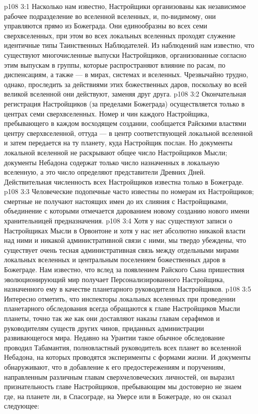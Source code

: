 \vs p108 3:1 Насколько нам известно, Настройщики организованы как независимое рабочее подразделение во вселенной вселенных, и, по\hyp{}видимому, они управляются прямо из Божеграда. Они единообразны во всех семи сверхвселенных, при этом во всех локальных вселенных проходят служение идентичные типы Таинственных Наблюдателей. Из наблюдений нам известно, что существуют многочисленные выпуски Настройщиков, организованные согласно этим выпускам в группы, которые распространяют влияние по расам, по диспенсациям, а также --- в мирах, системах и вселенных. Чрезвычайно трудно, однако, проследить за действиями этих божественных даров, поскольку во всей великой вселенной они действуют, заменяя друг друга.
\vs p108 3:2 Окончательная регистрация Настройщиков (за пределами Божеграда) осуществляется только в центрах семи сверхвселенных. Номер и чин каждого Настройщика, пребывающего в каждом восходящем создании, сообщается Райскими властями центру сверхвселенной, оттуда --- в центр соответствующей локальной вселенной и затем передается на ту планету, куда Настройщик послан. Но документы локальной вселенной не раскрывают общее число Настройщиков Мысли; документы Небадона содержат только число назначенных в локальную вселенную, а это число определяют представители Древних Дней. Действительная численность всех Настройщиков известна только в Божеграде.
\vs p108 3:3 Человеческие подопечные часто известны по номерам их Настройщиков; смертные не получают настоящих имен до их слияния с Настройщиками, объединение с которыми отмечается дарованием новому созданию нового имени хранительницей предназначения.
\vs p108 3:4 Хотя у нас существуют записи о Настройщиках Мысли в Орвонтоне и хотя у нас нет абсолютно никакой власти над ними и никакой административной связи с ними, мы твердо убеждены, что существует очень тесная административная связь между отдельными мирами локальных вселенных и центральным поселением божественных даров в Божеграде. Нам известно, что вслед за появлением Райского Сына пришествия эволюционирующий мир получает Персонализированного Настройщика, назначенного ему в качестве планетарного руководителя Настройщиков.
\vs p108 3:5 \pc Интересно отметить, что инспекторы локальных вселенных при проведении планетарного обследования всегда обращаются к главе Настройщиков Мысли планеты, точно так же как они доставляют наказы главам серафимов и руководителям существ других чинов, приданных администрации развивающегося мира. Недавно на Урантии такое обычное обследование проводил Табамантия, полновластный руководитель всех планет во вселенной Небадона, на которых проводятся эксперименты с формами жизни. И документы обнаруживают, что в добавление к его предостережениям и поручениям, направленным различным главам сверхчеловеческих личностей, он выразил признательность главе Настройщиков, пребывающим мы достоверно не знаем где, на планете ли, в Спасограде, на Уверсе или в Божеграде, но он сказал следующее:
